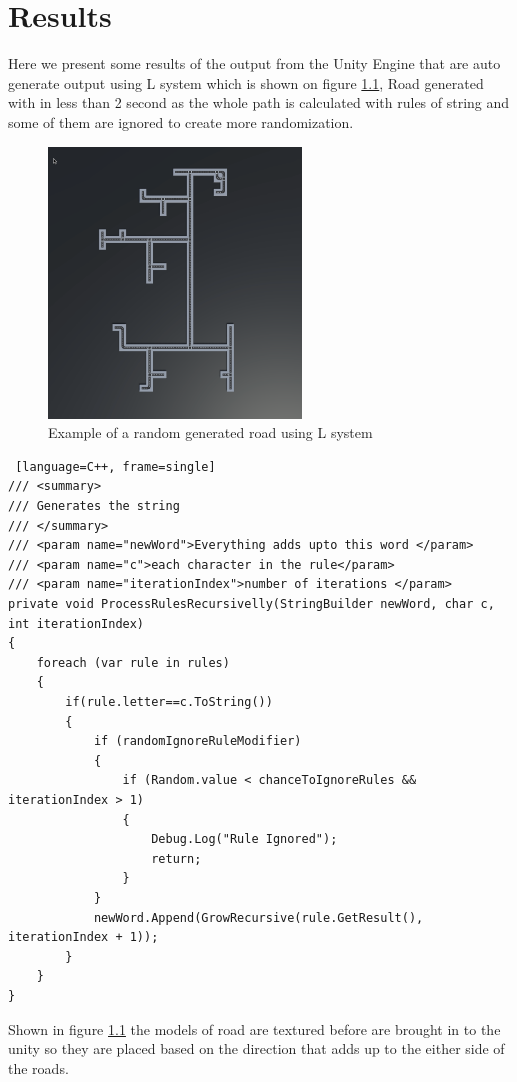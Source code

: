 \chapter{Results}


\large Here we present some results of the output from the Unity Engine that are  auto generate output using L system which is shown on figure \ref{fig:road}, Road generated with in less than 2 second as the whole path is calculated with rules of string and some of them are ignored to create more randomization.

\begin{figure}[h]
\caption{Example of a random generated road using L system}
\label{fig:road}
\vspace{0.3cm}
\centering
\includegraphics[width=0.6\textwidth]{5. results/Road Outpu.png}
\end{figure}

\renewcommand{\baselinestretch}{1.5}
\begin{scriptsize}
\begin{lstlisting} [language=C++, frame=single]
/// <summary>
/// Generates the string 
/// </summary>
/// <param name="newWord">Everything adds upto this word </param>
/// <param name="c">each character in the rule</param>
/// <param name="iterationIndex">number of iterations </param>
private void ProcessRulesRecursivelly(StringBuilder newWord, char c, int iterationIndex)
{
    foreach (var rule in rules)
    {
        if(rule.letter==c.ToString())
        {
            if (randomIgnoreRuleModifier)
            {
                if (Random.value < chanceToIgnoreRules && iterationIndex > 1)
                {
                    Debug.Log("Rule Ignored");
                    return;
                }
            }
            newWord.Append(GrowRecursive(rule.GetResult(), iterationIndex + 1));
        }
    }
}
\end{lstlisting}

\end{scriptsize}

\renewcommand{\baselinestretch}{1.5}

\large Shown in figure \ref{fig:road} the models of road are textured before are brought in to the unity so they are placed based on the direction that adds up to the either side of the roads.